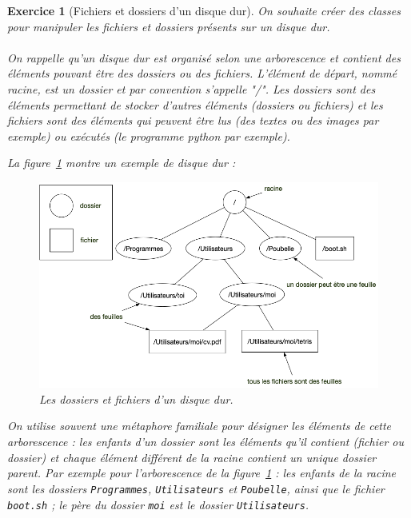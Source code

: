 \documentclass{article}
\theoremstyle{exostyle}
\newtheorem{exo}{Exercice}
\theoremstyle{partiestyle}
\theoremstyle{questionstyle}
\begin{document}
\clearpage
\begin{exo}[Fichiers et dossiers d'un disque dur]

On souhaite créer des classes pour manipuler les fichiers et dossiers présents sur un disque dur. 

\paragraph{}On rappelle qu'un disque dur est organisé selon une arborescence et contient des éléments pouvant être des {\it dossiers} ou des {\it fichiers}. L'élément de départ, nommé racine, est un dossier et par convention s'appelle "/". Les dossiers sont des éléments permettant de stocker d'autres éléments (dossiers ou fichiers)  et les fichiers sont des éléments qui peuvent être lus (des textes ou des images par exemple) ou exécutés (le programme python par exemple).

La figure~\ref{fig-fichiers} montre un exemple de disque dur :

\begin{figure}[h]
\centering
\includegraphics[scale=.5]{arborescence.png}
    
\caption{Les dossiers et fichiers d'un disque dur.\label{fig-fichiers}}

\end{figure}

On utilise souvent une métaphore familiale pour désigner les éléments de cette arborescence : les {\it enfants} d'un dossier sont les éléments qu'il contient (fichier ou dossier) et chaque élément différent de la racine contient un unique dossier {\it parent}. Par exemple pour l'arborescence de la figure~\ref{fig-fichiers} : les enfants de la racine sont les dossiers \verb`Programmes`, \verb`Utilisateurs` et \verb`Poubelle`, ainsi que le fichier \verb`boot.sh` ; le père du dossier \verb`moi` est le dossier \verb`Utilisateurs`.



\end{exo}
\end{document}
